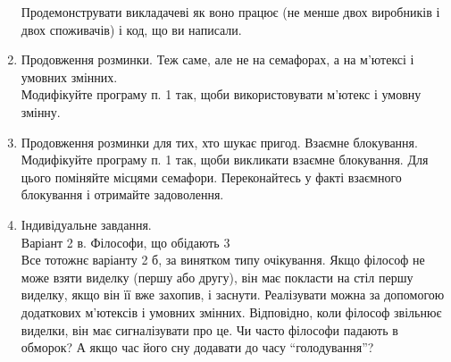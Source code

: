 \documentclass[a4paper,12pt]{article}
\begin{document}
\begin{enumerate}
        Продемонструвати викладачеві як воно працює (не менше двох виробників і двох споживачів) і код, що ви написали.
        \item Продовження розминки. Теж саме, але не на семафорах, а на м’ютексі і умовних змінних. \\
        Модифікуйте програму п. 1 так, щоби використовувати м’ютекс і умовну змінну.
        \item Продовження розминки для тих, хто шукає пригод. Взаємне блокування. \\
        Модифікуйте програму п. 1 так, щоби викликати взаємне блокування. Для цього поміняйте місцями семафори.
        Переконайтесь у факті взаємного блокування і отримайте задоволення.
        \item Індивідуальне завдання. \\
        Варіант 2 в. Філософи, що обідають 3 \\
        Все тотожнє варіанту 2 б, за винятком типу очікування.
        Якщо філософ не може взяти виделку (першу або другу), він має покласти на стіл першу виделку, якщо він її вже
        захопив, і заснути. Реалізувати можна за допомогою додаткових м’ютексів і умовних змінних. Відповідно, коли
        філософ звільнює виделки, він має сигналізувати про це. Чи часто філософи падають в обморок? А якщо час його сну додавати до часу “голодування”?
    \end{enumerate}
\end{document}
